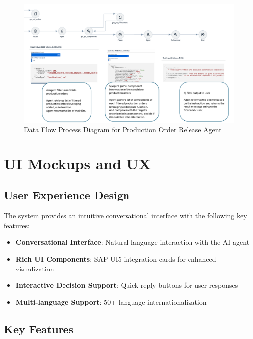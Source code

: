     \begin{figure}[h]
        \centering
        \includegraphics[width=1.0\textwidth]{graphic/flow-2.pdf}
        \caption{Data Flow Process Diagram for Production Order Release Agent}
        \label{fig:data-flow}
    \end{figure}

\section{UI Mockups and UX}

\subsection{User Experience Design}

The system provides an intuitive conversational interface with the following key features:

\begin{itemize}
    \item \textbf{Conversational Interface}: Natural language interaction with the AI agent
    \item \textbf{Rich UI Components}: SAP UI5 integration cards for enhanced visualization
    \item \textbf{Interactive Decision Support}: Quick reply buttons for user responses
    \item \textbf{Multi-language Support}: 50+ language internationalization
\end{itemize}

\subsection{Key Features}

